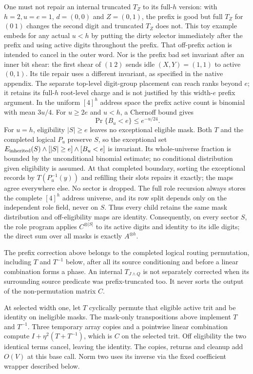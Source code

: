 One must not repair an internal truncated $T_Z$ to its full-$h$
version: with $h=2,u=e=1$, $d=(0,0)$ and $Z=(0,1)$, the prefix is
good but full $T_Z$ for $(0\ 1)$ changes the second digit and truncated
$T_Z$ does not. This toy example embeds for any actual $u<h$ by
putting the dirty selector immediately after the prefix and
using active digits throughout the prefix.
That off-prefix action is intended to cancel in the
outer word. Nor is the prefix bad set invariant after an inner bit
shear: the first shear of $(1\ 2)$ sends idle $(X,Y)=(1,1)$ to active
$(0,1)$. Its tile repair uses a different invariant, as specified in
the native appendix.
The separate top-level digit-group placement can reach ranks beyond
$e$; it retains its full-$h$ root-level charge and is not justified
by this width-$e$ prefix argument.
In the uniform $[4]^h$
address space the prefix active count is
binomial with mean $3u/4$. For $u\ge2e$ and $u<h$, a Chernoff bound gives
\[
 \Pr\{B_u<e\}\le e^{-u/24}.                            \tag{A.15}
\]
For $u=h$, eligibility $|S|\ge e$ leaves no exceptional eligible mask.
Both $T$ and the completed logical $P_u$ preserve $S$, so the
exceptional set
$E_{\rm inherited}(S)\wedge[|S|\ge e]\wedge[B_u<e]$ is invariant.
Its whole-universe fraction is bounded by the unconditional binomial
estimate; no conditional distribution given eligibility is assumed.
At that completed boundary, sorting the exceptional records by
$T(P_u^{-1}(y))$ and refilling their slots repairs it exactly;
the maps agree everywhere else. No sector is dropped. The full role recursion always
stores the complete $[4]^h$ address universe, and its row split depends
only on the independent role field, never on $S$. Thus every child
retains the same mask distribution and off-eligibility maps are identity.
Consequently, on every sector $S$, the role program applies
$C^{\otimes |S|}$ to its active digits and identity to its idle digits;
the direct sum over all masks is exactly $A^{\otimes h}$.

The prefix correction above belongs to the completed logical routing
permutation, including $T$ and $T^{-1}$ below, after all its source
conditioning and before a linear combination forms a phase. An
internal $T_{J\wedge Q}$ is not separately corrected when its surrounding
source predicate was prefix-truncated too. It never sorts the output
of the non-permutation matrix $C$.

At selected width one, let $T$ cyclically permute that eligible active
trit and be identity on ineligible masks. The mask-only transpositions
above implement $T$ and $T^{-1}$. Three temporary array copies and a
pointwise linear combination compute
$I+\eta^2(T+T^{-1})$, which is $C$ on the selected trit. Off eligibility
the two identical terms cancel, leaving the identity. The copies,
returns and cleanup add $O(V)$ at this base call. Norm two uses its
inverse via the fixed coefficient wrapper described below.

